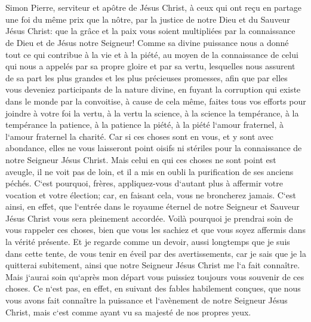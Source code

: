 

\chapter{}

\verse Simon Pierre, serviteur et apôtre de Jésus Christ, à ceux qui ont reçu en partage une foi du même prix que la nôtre, par la justice de notre Dieu et du Sauveur Jésus Christ: 
\verse que la grâce et la paix vous soient multipliées par la connaissance de Dieu et de Jésus notre Seigneur! 
\verse Comme sa divine puissance nous a donné tout ce qui contribue à la vie et à la piété, au moyen de la connaissance de celui qui nous a appelés par sa propre gloire et par sa vertu, 
\verse lesquelles nous assurent de sa part les plus grandes et les plus précieuses promesses, afin que par elles vous deveniez participants de la nature divine, en fuyant la corruption qui existe dans le monde par la convoitise, 
\verse à cause de cela même, faites tous vos efforts pour joindre à votre foi la vertu, à la vertu la science, 
\verse à la science la tempérance, à la tempérance la patience, à la patience la piété, 
\verse à la piété l`amour fraternel, à l`amour fraternel la charité. 
\verse Car si ces choses sont en vous, et y sont avec abondance, elles ne vous laisseront point oisifs ni stériles pour la connaissance de notre Seigneur Jésus Christ. 
\verse Mais celui en qui ces choses ne sont point est aveugle, il ne voit pas de loin, et il a mis en oubli la purification de ses anciens péchés. 
\verse C`est pourquoi, frères, appliquez-vous d`autant plus à affermir votre vocation et votre élection; car, en faisant cela, vous ne broncherez jamais. 
\verse C`est ainsi, en effet, que l`entrée dans le royaume éternel de notre Seigneur et Sauveur Jésus Christ vous sera pleinement accordée. 
\verse Voilà pourquoi je prendrai soin de vous rappeler ces choses, bien que vous les sachiez et que vous soyez affermis dans la vérité présente. 
\verse Et je regarde comme un devoir, aussi longtemps que je suis dans cette tente, de vous tenir en éveil par des avertissements, 
\verse car je sais que je la quitterai subitement, ainsi que notre Seigneur Jésus Christ me l`a fait connaître. 
\verse Mais j`aurai soin qu`après mon départ vous puissiez toujours vous souvenir de ces choses. 
\verse Ce n`est pas, en effet, en suivant des fables habilement conçues, que nous vous avons fait connaître la puissance et l`avènement de notre Seigneur Jésus Christ, mais c`est comme ayant vu sa majesté de nos propres yeux. 

